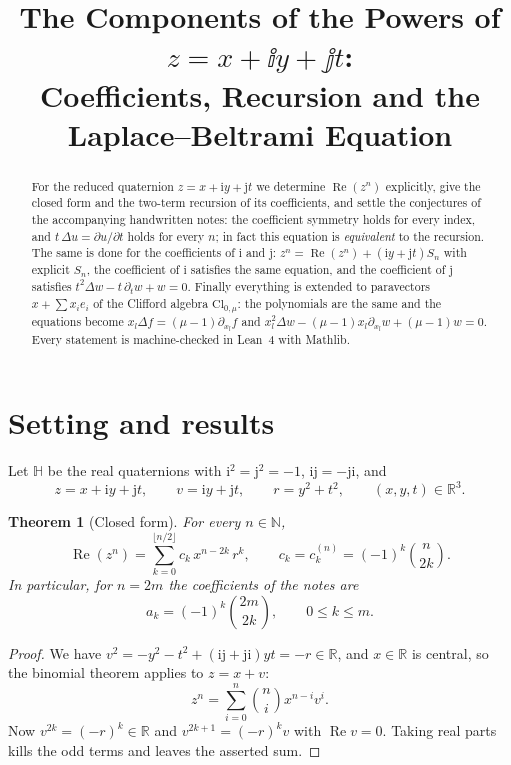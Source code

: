 \documentclass[11pt,a4paper]{article}
\title{The Components of the Powers of $z=x+\ii y+\jj t$:\\
Coefficients, Recursion and the Laplace--Beltrami Equation}
\author{}
\date{}
\newcommand{\ii}{\mathrm{i}}
\newcommand{\jj}{\mathrm{j}}
\DeclareMathOperator{\Real}{Re}
\newcommand{\R}{\mathbb{R}}
\newcommand{\N}{\mathbb{N}}
\newcommand{\HH}{\mathbb{H}}
\newtheorem{theorem}{Theorem}
\theoremstyle{remark}
\begin{document}
\maketitle

\begin{abstract}
For the reduced quaternion $z=x+\ii y+\jj t$ we determine $\Real(z^n)$ explicitly,
give the closed form and the two-term recursion of its coefficients, and settle the
conjectures of the accompanying handwritten notes:
the coefficient symmetry holds for every index, and $t\,\Delta u=\partial u/\partial t$
holds for every $n$; in fact this equation is \emph{equivalent} to the recursion.
The same is done for the coefficients of $\ii$ and $\jj$: $z^n=\Real(z^n)+(\ii y+\jj t)S_n$
with explicit $S_n$, the coefficient of $\ii$ satisfies the same equation, and the coefficient
of $\jj$ satisfies $t^2\Delta w-t\,\partial_tw+w=0$.
Finally everything is extended to paravectors $x+\sum x_ie_i$ of the Clifford algebra
$\mathrm{Cl}_{0,\mu}$: the polynomials are the same and the equations become
$x_l\Delta f=(\mu-1)\partial_{x_l}f$ and
$x_l^2\Delta w-(\mu-1)x_l\partial_{x_l}w+(\mu-1)w=0$.
Every statement is machine-checked in Lean~4 with Mathlib.
\end{abstract}

\section{Setting and results}

Let $\HH$ be the real quaternions with $\ii^2=\jj^2=-1$, $\ii\jj=-\jj\ii$, and
\[
  z=x+\ii y+\jj t,\qquad v=\ii y+\jj t,\qquad r=y^2+t^2,\qquad (x,y,t)\in\R^3 .
\]

\begin{theorem}[Closed form]\label{thm:closed}
For every $n\in\N$,
\[
  \Real(z^n)=\sum_{k=0}^{\lfloor n/2\rfloor} c_k\,x^{n-2k}\,r^k,
  \qquad c_k=c_k^{(n)}=(-1)^k\binom{n}{2k}.
\]
In particular, for $n=2m$ the coefficients of the notes are
\[
  \boxed{\;a_k=(-1)^k\binom{2m}{2k},\qquad 0\le k\le m.\;}
\]
\end{theorem}

\begin{proof}
We have $v^2=-y^2-t^2+(\ii\jj+\jj\ii)yt=-r\in\R$, and $x\in\R$ is central, so the
binomial theorem applies to $z=x+v$:
\[
  z^n=\sum_{i=0}^{n}\binom{n}{i}x^{n-i}v^{i}.
\]
Now $v^{2k}=(-r)^k\in\R$ and $v^{2k+1}=(-r)^k v$ with $\Real v=0$. Taking real parts
kills the odd terms and leaves the asserted sum.
\end{proof}
\end{document}
